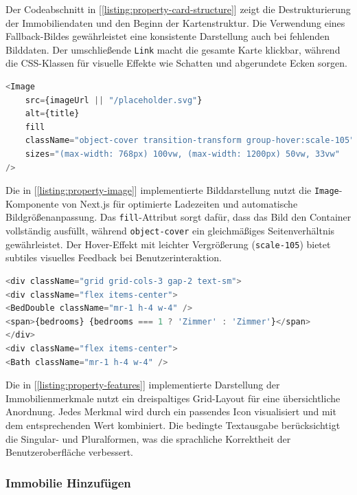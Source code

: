 		
		Der Codeabschnitt in [\ref{listing:property-card-structure}] zeigt die Destrukturierung der Immobiliendaten und den Beginn der Kartenstruktur. Die Verwendung eines Fallback-Bildes gewährleistet eine konsistente Darstellung auch bei fehlenden Bilddaten. Der umschließende \texttt{Link} macht die gesamte Karte klickbar, während die CSS-Klassen für visuelle Effekte wie Schatten und abgerundete Ecken sorgen.
		
\begin{lstlisting}[language=JavaScript, caption={Optimierte Bilddarstellung.}, label={listing:property-image}]
<Image
	src={imageUrl || "/placeholder.svg"}
	alt={title}
	fill
	className="object-cover transition-transform group-hover:scale-105"
	sizes="(max-width: 768px) 100vw, (max-width: 1200px) 50vw, 33vw"
/>
\end{lstlisting}

		
		Die in [\ref{listing:property-image}] implementierte Bilddarstellung nutzt die \texttt{Image}-Komponente von Next.js für optimierte Ladezeiten und automatische Bildgrößenanpassung. Das \texttt{fill}-Attribut sorgt dafür, dass das Bild den Container vollständig ausfüllt, während \texttt{object-cover} ein gleichmäßiges Seitenverhältnis gewährleistet. Der Hover-Effekt mit leichter Vergrößerung (\texttt{scale-105}) bietet subtiles visuelles Feedback bei Benutzerinteraktion.
		
		
\begin{lstlisting}[language=JavaScript, caption={Darstellung der Immobilienmerkmale.}, label={listing:property-features}]
<div className="grid grid-cols-3 gap-2 text-sm">
<div className="flex items-center">
<BedDouble className="mr-1 h-4 w-4" />
<span>{bedrooms} {bedrooms === 1 ? 'Zimmer' : 'Zimmer'}</span>
</div>
<div className="flex items-center">
<Bath className="mr-1 h-4 w-4" />
\end{lstlisting}

		
		Die in [\ref{listing:property-features}] implementierte Darstellung der Immobilienmerkmale nutzt ein dreispaltiges Grid-Layout für eine übersichtliche Anordnung. Jedes Merkmal wird durch ein passendes Icon visualisiert und mit dem entsprechenden Wert kombiniert. Die bedingte Textausgabe berücksichtigt die Singular- und Pluralformen, was die sprachliche Korrektheit der Benutzeroberfläche verbessert.
		
		
		
		
		\subsubsection{Immobilie Hinzufügen}
		
